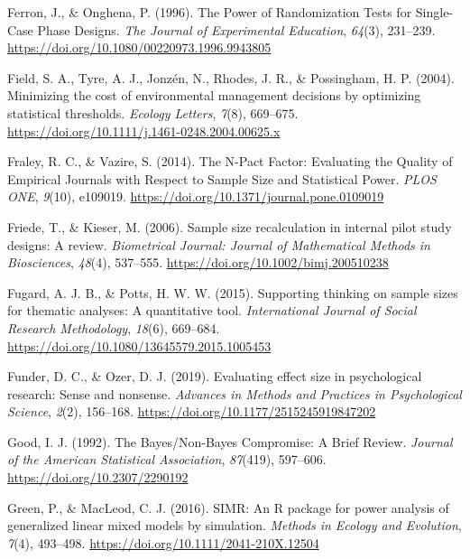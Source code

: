 \documentclass[
  english,
  ,jou, a4paper,floatsintext]{apa6}
\newlength{\cslhangindent}
\newenvironment{cslreferences}%
  {\setlength{\parindent}{0pt}%
  \everypar{\setlength{\hangindent}{\cslhangindent}}\ignorespaces}%
  {\par}
\begin{document}
\begin{cslreferences}
\leavevmode\hypertarget{ref-ferron_power_1996}{}%
Ferron, J., \& Onghena, P. (1996). The Power of Randomization Tests for Single-Case Phase Designs. \emph{The Journal of Experimental Education}, \emph{64}(3), 231--239. \url{https://doi.org/10.1080/00220973.1996.9943805}

\leavevmode\hypertarget{ref-field_minimizing_2004}{}%
Field, S. A., Tyre, A. J., Jonzén, N., Rhodes, J. R., \& Possingham, H. P. (2004). Minimizing the cost of environmental management decisions by optimizing statistical thresholds. \emph{Ecology Letters}, \emph{7}(8), 669--675. \url{https://doi.org/10.1111/j.1461-0248.2004.00625.x}

\leavevmode\hypertarget{ref-fraley_n-pact_2014}{}%
Fraley, R. C., \& Vazire, S. (2014). The N-Pact Factor: Evaluating the Quality of Empirical Journals with Respect to Sample Size and Statistical Power. \emph{PLOS ONE}, \emph{9}(10), e109019. \url{https://doi.org/10.1371/journal.pone.0109019}

\leavevmode\hypertarget{ref-friede_sample_2006}{}%
Friede, T., \& Kieser, M. (2006). Sample size recalculation in internal pilot study designs: A review. \emph{Biometrical Journal: Journal of Mathematical Methods in Biosciences}, \emph{48}(4), 537--555. \url{https://doi.org/10.1002/bimj.200510238}

\leavevmode\hypertarget{ref-fugard_supporting_2015}{}%
Fugard, A. J. B., \& Potts, H. W. W. (2015). Supporting thinking on sample sizes for thematic analyses: A quantitative tool. \emph{International Journal of Social Research Methodology}, \emph{18}(6), 669--684. \url{https://doi.org/10.1080/13645579.2015.1005453}

\leavevmode\hypertarget{ref-funder_evaluating_2019}{}%
Funder, D. C., \& Ozer, D. J. (2019). Evaluating effect size in psychological research: Sense and nonsense. \emph{Advances in Methods and Practices in Psychological Science}, \emph{2}(2), 156--168. \url{https://doi.org/10.1177/2515245919847202}

\leavevmode\hypertarget{ref-good_bayesnon-bayes_1992}{}%
Good, I. J. (1992). The Bayes/Non-Bayes Compromise: A Brief Review. \emph{Journal of the American Statistical Association}, \emph{87}(419), 597--606. \url{https://doi.org/10.2307/2290192}

\leavevmode\hypertarget{ref-green_simr_2016}{}%
Green, P., \& MacLeod, C. J. (2016). SIMR: An R package for power analysis of generalized linear mixed models by simulation. \emph{Methods in Ecology and Evolution}, \emph{7}(4), 493--498. \url{https://doi.org/10.1111/2041-210X.12504}


\end{cslreferences}
\end{document}
